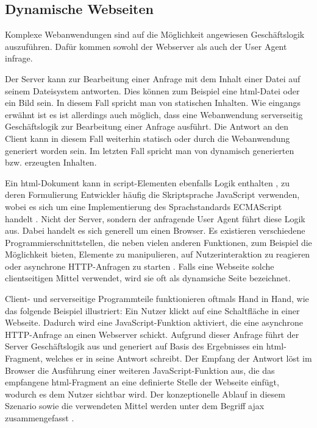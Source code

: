         \subsection{Dynamische Webseiten}
            Komplexe Webanwendungen sind auf die Möglichkeit angewiesen Geschäftslogik auszuführen.
            Dafür kommen sowohl der Webserver als auch der User Agent infrage.

            Der Server kann zur Bearbeitung einer Anfrage mit dem Inhalt einer Datei auf seinem Dateisystem antworten.
            Dies können zum Beispiel eine \gls{html}-Datei oder ein Bild sein.
            In diesem Fall spricht man von statischen Inhalten.
            Wie eingangs erwähnt ist es ist allerdings auch möglich,
            dass eine Webanwendung serverseitig Geschäftslogik zur Bearbeitung einer Anfrage ausführt.
            Die Antwort an den Client kann in diesem Fall weiterhin statisch oder
            durch die Webanwendung generiert worden sein.
            Im letzten Fall spricht man von dynamisch generierten bzw. erzeugten Inhalten.

            Ein \gls{html}-Dokument kann in script-Elementen ebenfalls Logik enthalten
            \cite[Kapitel 4.11]{w3c:html5},
            zu deren Formulierung Entwickler häufig die Skriptsprache JavaScript verwenden,
            wobei es sich um eine Implementierung des Sprachstandards ECMAScript handelt
            \cite{ecma:ecmaScript}.
            Nicht der Server, sondern der anfragende User Agent führt diese Logik aus.
            Dabei handelt es sich generell um einen Browser.
            Es existieren verschiedene Programmierschnittstellen,
            die neben vielen anderen Funktionen, zum Beispiel die Möglichkeit bieten,
            Elemente zu manipulieren, auf Nutzerinteraktion zu reagieren
            oder asynchrone HTTP-Anfragen zu starten \cite[Kapitel 8]{whatwg:html}\cite{whatwg:xhr}.
            Falls eine Webseite solche clientseitigen Mittel verwendet,
            wird sie oft als dynamsiche Seite bezeichnet.
            
            Client- und serverseitige Programmteile funktionieren oftmals Hand in Hand,
            wie das folgende Beispiel illustriert:
            Ein Nutzer klickt auf eine Schaltfläche in einer Webseite.
            Dadurch wird eine JavaScript-Funktion aktiviert,
            die eine asynchrone HTTP-Anfrage an einen Webserver schickt.
            Aufgrund dieser Anfrage führt der Server Geschäftslogik aus
            und generiert auf Basis des Ergebnisses ein \gls{html}-Fragment,
            welches er in seine Antwort schreibt.
            Der Empfang der Antwort löst im Browser die Ausführung einer weiteren
            JavaScript-Funktion aus, die das empfangene \gls{html}-Fragment
            an eine definierte Stelle der Webseite einfügt,
            wodurch es dem Nutzer sichtbar wird.
            Der konzeptionelle Ablauf in diesem Szenario sowie die verwendeten Mittel
            werden unter dem Begriff \gls{ajax} zusammengefasst \cite{garrett:ajax}.

